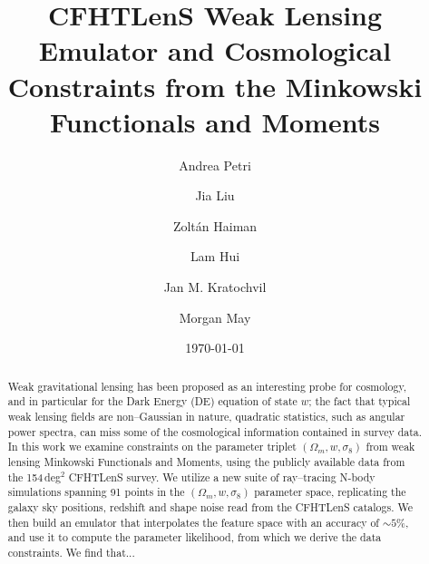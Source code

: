 \documentclass[reprint,aps,prd,superscriptaddress,showkeys,showpacs]{revtex4-1}
\begin{document}
\title{CFHTLenS Weak Lensing Emulator and Cosmological Constraints from the Minkowski Functionals and Moments}

\author{Andrea Petri}

\author{Jia Liu}

\author{Zolt\'an Haiman}

\author{Lam Hui}

\author{Jan M. Kratochvil}

\author{Morgan May}

\date{\today}

\label{firstpage}

\begin{abstract}
Weak gravitational lensing has been proposed as an interesting probe for cosmology, and in particular for the Dark Energy (DE) equation of state $w$; the fact that typical weak lensing fields are non--Gaussian in nature, quadratic statistics, such as angular power spectra, can miss some of the cosmological information contained in survey data. In this work we examine constraints on the parameter triplet $(\Omega_m,w,\sigma_8)$ from weak lensing Minkowski Functionals and Moments, using the publicly available data from the 154\,deg$^2$ CFHTLenS survey. We utilize a new suite of ray--tracing N-body simulations spanning 91 points in the $(\Omega_m,w,\sigma_8)$ parameter space, replicating the galaxy sky positions, redshift and shape noise read from the CFHTLenS catalogs. We then build an emulator that interpolates the feature space with an accuracy of $\sim5\%$, and use it to compute the parameter likelihood, from which we derive the data constraints. We find that...

\end{abstract}

\end{document}
